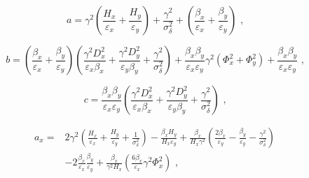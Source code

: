 \begin{equation}
    a = \gamma^2 \left(\frac{H_x}{\varepsilon_x} + \frac{H_y}{\varepsilon_y}\right) + \frac{\gamma^2}{\sigma_{\delta}^{2}} + \left(\frac{\beta_x}{\varepsilon_x} + \frac{\beta_y}{\varepsilon_y} \right) \text{ ,}
    \label{equation:bm_a}
\end{equation}

\begin{equation}
    b = \left(\frac{\beta_x}{\varepsilon_x} + \frac{\beta_y}{\varepsilon_y}\right) \left(\frac{\gamma^2 D_x^{2}}{\varepsilon_x \beta_x} + \frac{\gamma^2 D_y^{2}}{\varepsilon_y \beta_y} + \frac{\gamma^2}{\sigma_{\delta}^{2}}\right) + \frac{\beta_x \beta_y}{\varepsilon_x \varepsilon_y} \gamma^2 \left( \Phi_x^{2} + \Phi_y^{2}\right) + \frac{\beta_x \beta_y}{\varepsilon_x \varepsilon_y} \text{ ,}
    \label{equation:bm_b}
\end{equation}

\begin{equation}
    c = \frac{\beta_x \beta_y}{\varepsilon_x \varepsilon_y} \left( \frac{\gamma^2 D_x^{2}}{\varepsilon_x \beta_x} + \frac{\gamma^2 D_y^{2}}{\varepsilon_y \beta_y} + \frac{\gamma^2}{\sigma_{\delta}^{2}} \right) \text{ ,}
    \label{equation:bm_c}
\end{equation}

\begin{equation}
    \begin{aligned}
    a_x = & 2 \gamma^2 \left(\frac{H_x}{\varepsilon_x} + \frac{H_y}{\varepsilon_y} + \frac{1}{\sigma_{\delta}^{2}}\right) - \frac{\beta_x H_y}{H_x \varepsilon_y} + \frac{\beta_x}{H_x \gamma^2} \left( \frac{2 \beta_x}{\varepsilon_y} - \frac{\beta_y}{\varepsilon_y} - \frac{\gamma^2}{\sigma_{\delta}^{2}} \right) \\
          & - 2 \frac{\beta_x}{\varepsilon_x} \frac{\beta_y}{\varepsilon_y} + \frac{\beta_x}{\gamma^2 H_x} \left( \frac{6 \beta_x}{\varepsilon_x} \gamma^2 \Phi_x^{2} \right) \text{ ,}
    \end{aligned}
    \label{equation:bm_ax}
\end{equation}

